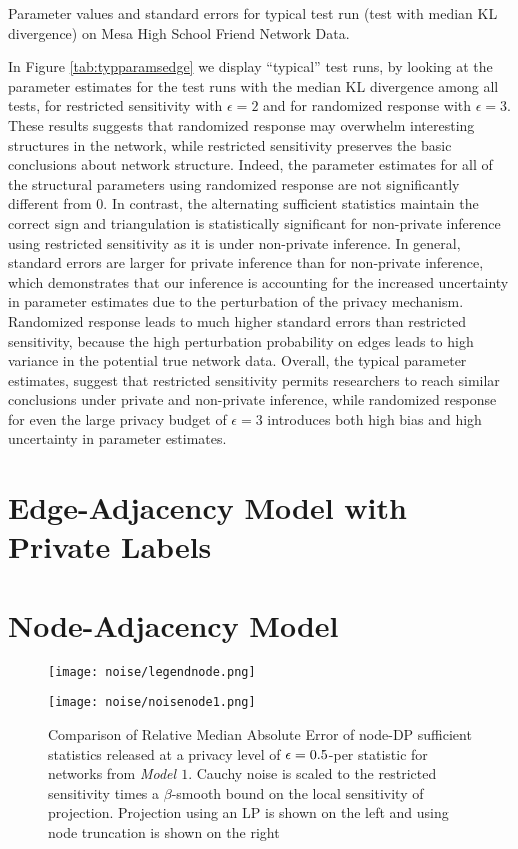     \begin{table}[h]
  	\caption{Parameter values and standard errors for typical test run (test with median KL divergence) on Mesa High School Friend Network Data.} 
  	\label{tab:typparamsedge}
  	\centering
  	
  \end{table}
  
  In Figure \ref{tab:typparamsedge} we display ``typical'' test runs, by looking at the parameter estimates for the test runs with the median KL divergence among all tests, for  restricted sensitivity with $\epsilon=2$ and for randomized response with $\epsilon=3$. These results suggests that randomized response may overwhelm interesting structures in the network, while restricted sensitivity preserves the basic conclusions about network structure. Indeed, the parameter estimates for all of the structural parameters using randomized response are not significantly different from $0$. In contrast, the alternating sufficient statistics maintain the correct sign and triangulation is statistically significant for non-private inference using restricted sensitivity as it is under non-private inference. In general, standard errors are larger for private inference than for non-private inference, which demonstrates that our inference is accounting for the increased uncertainty in parameter estimates due to the perturbation of the privacy mechanism. Randomized response leads to much higher standard errors than restricted sensitivity, because the high perturbation probability on edges leads to high variance in the potential true network data. Overall, the typical parameter estimates, suggest that restricted sensitivity permits researchers to reach similar conclusions under private and non-private inference, while randomized response for even the large privacy budget of $\epsilon=3$ introduces both high bias and high uncertainty in parameter estimates.
 
 
 \section{Edge-Adjacency Model with Private Labels}

 
 \section{Node-Adjacency Model}
 
\begin{figure}[h]
\caption{Comparison of Relative Median Absolute Error of node-DP sufficient statistics released at a privacy level of $\epsilon = 0.5$-per statistic for networks from \emph{Model $\mathit{1}$}. Cauchy noise is scaled to the restricted sensitivity times a $\beta$-smooth bound on the local sensitivity of projection. Projection using an LP is shown on the left and using node truncation is shown on the right}
\centering
\texttt{[image: noise/legendnode.png]}\\\vspace{0.2in}

\texttt{[image: noise/noisenode1.png]}
\end{figure}
 